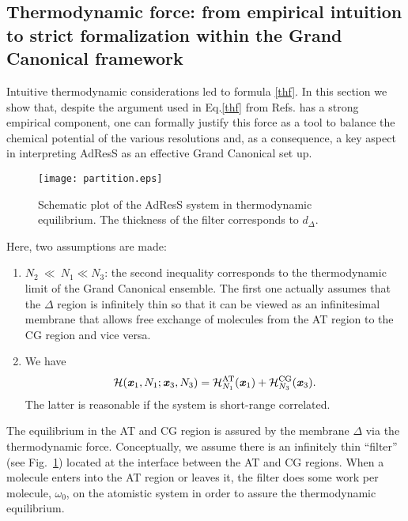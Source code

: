 \documentclass[aip,jcp,a4paper,reprint,onecolumn]{revtex4-1}
\newcommand{\vect}[1]{\textbf{\textit{#1}}}
\newcommand{\AT}{{\textrm{{AT}}}}
\newcommand{\CG}{{\textrm{CG}}}
\newcommand{\HY}{{\Delta}}
\begin{document}
\subsection{Thermodynamic force: from empirical intuition to strict formalization within the Grand Canonical framework}
Intuitive thermodynamic considerations led to formula \eqref{thf}. In this section we show that, despite the argument used in Eq.\ref{thf} from Refs.\cite{prlgc,rdfcorr} has a strong empirical component, one can formally justify this force
as a tool to balance the chemical potential of the various resolutions and, as a consequence,  a key aspect in interpreting AdResS as an effective Grand Canonical set up. 
\begin{figure}
  \centering
  \begin{minipage}[t]{0.49\linewidth}
  \texttt{[image: partition.eps]}    
  \end{minipage}
  \caption{Schematic plot of the AdResS system in thermodynamic equilibrium. The thickness of the filter corresponds to $d_{\Delta}$.}
  \label{fig:tmp1}
\end{figure}
Here, two assumptions are made:
\begin{enumerate}
\item $N_2\ {\ll}\ N_1 \ll N_3$: the second inequality corresponds to
  the thermodynamic limit of the Grand Canonical ensemble. The first
  one actually assumes that the $\HY$ region is infinitely thin so that it
  can be viewed as an infinitesimal membrane that allows free exchange of molecules from
  the AT region to the CG region and vice versa.
\item We have 
  \begin{equation}
    \mathcal H(\vect x_1, N_1; \vect x_3, N_3) =
    \mathcal H_{N_1}^{\AT}(\vect x_1) + \mathcal H_{N_3}^{\CG}(\vect x_3). 
  \end{equation}
  The latter is reasonable if the system is
  short-range correlated.
  
\end{enumerate}
The equilibrium in the AT and CG region is assured by the membrane $\HY$ via the thermodynamic force. Conceptually, we assume there is an infinitely thin
``filter'' (see Fig.~\ref{fig:tmp1}) located at the interface between
the AT and CG regions. When a molecule enters into
the AT region or leaves it, the filter does some work per molecule, $\omega_0$, on the atomistic system in order to assure the thermodynamic equilibrium.
\end{document}
